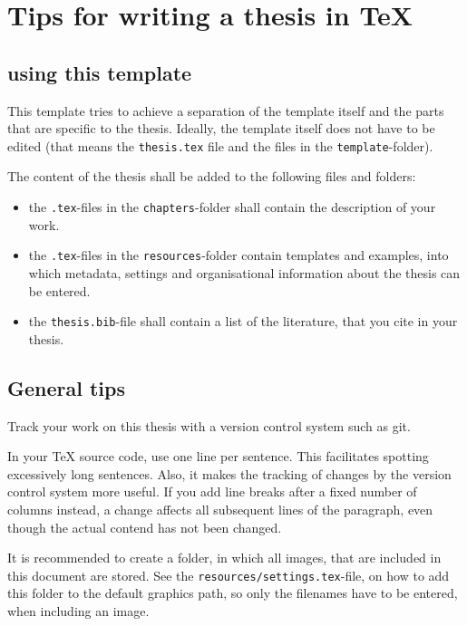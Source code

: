 \chapter{Tips for writing a thesis in TeX}

\section{using this template}
This template tries to achieve a separation of the template itself and the parts that are specific to the thesis.
Ideally, the template itself does not have to be edited (that means the \texttt{thesis.tex} file and the files in the \texttt{template}-folder).

The content of the thesis shall be added to the following files and folders:
\begin{itemize}
	\item the \texttt{.tex}-files in the \texttt{chapters}-folder shall contain the description of your work.
	\item the \texttt{.tex}-files in the \texttt{resources}-folder contain templates and examples, into which metadata, settings and organisational information about the thesis can be entered.
	\item the \texttt{thesis.bib}-file shall contain a list of the literature, that you cite in your thesis.
\end{itemize}

\section{General tips}
Track your work on this thesis with a version control system such as git.

In your TeX source code, use one line per sentence.
This facilitates spotting excessively long sentences.
Also, it makes the tracking of changes by the version control system more useful.
If you add line breaks after a fixed number of columns instead, a change affects all subsequent lines of the paragraph, even though the actual contend has not been changed.

It is recommended to create a folder, in which all images, that are included in this document are stored.
See the \texttt{resources/settings.tex}-file, on how to add this folder to the default graphics path, so only the filenames have to be entered, when including an image.

